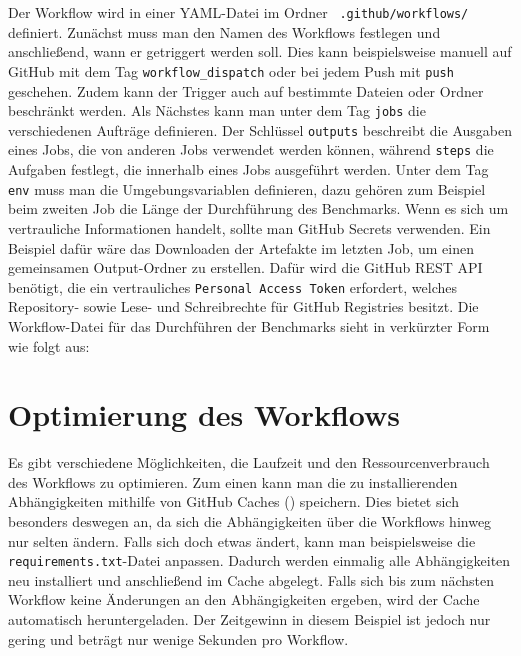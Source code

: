 Der Workflow wird in einer YAML-Datei im Ordner ~\texttt{.github/workflows/} definiert.
Zunächst muss man den Namen des Workflows festlegen und anschließend, wann er getriggert werden soll.
Dies kann beispielsweise manuell auf GitHub mit dem Tag \texttt{workflow\_dispatch} oder bei jedem Push mit \texttt{push} geschehen.
Zudem kann der Trigger auch auf bestimmte Dateien oder Ordner beschränkt werden.
Als Nächstes kann man unter dem Tag \texttt{jobs} die verschiedenen Aufträge definieren.
Der Schlüssel \texttt{outputs} beschreibt die Ausgaben eines Jobs, die von anderen Jobs verwendet werden können, während \texttt{steps} die Aufgaben festlegt, die innerhalb eines Jobs ausgeführt werden.
Unter dem Tag \texttt{env} muss man die Umgebungsvariablen definieren, dazu gehören zum Beispiel beim zweiten Job die Länge der Durchführung des Benchmarks.
Wenn es sich um vertrauliche Informationen handelt, sollte man GitHub Secrets verwenden.
Ein Beispiel dafür wäre das Downloaden der Artefakte im letzten Job, um einen gemeinsamen Output-Ordner zu erstellen.
Dafür wird die GitHub REST API benötigt, die ein vertrauliches \texttt{Personal Access Token} erfordert, welches Repository- sowie Lese- und Schreibrechte für GitHub Registries besitzt.
Die Workflow-Datei für das Durchführen der Benchmarks sieht in verkürzter Form wie folgt aus:

\vspace{-5pt}

\vspace{-5pt}

\section{Optimierung des Workflows}\label{sec:optimierung-des-workflows}

Es gibt verschiedene Möglichkeiten, die Laufzeit und den Ressourcenverbrauch des Workflows zu optimieren.
Zum einen kann man die zu installierenden Abhängigkeiten mithilfe von GitHub Caches (\cite{github_cache_doku}) speichern.
Dies bietet sich besonders deswegen an, da sich die Abhängigkeiten über die Workflows hinweg nur selten ändern.
Falls sich doch etwas ändert, kann man beispielsweise die \texttt{requirements.txt}-Datei anpassen.
Dadurch werden einmalig alle Abhängigkeiten neu installiert und anschließend im Cache abgelegt.
Falls sich bis zum nächsten Workflow keine Änderungen an den Abhängigkeiten ergeben, wird der Cache automatisch heruntergeladen.
Der Zeitgewinn in diesem Beispiel ist jedoch nur gering und beträgt nur wenige Sekunden pro Workflow.


